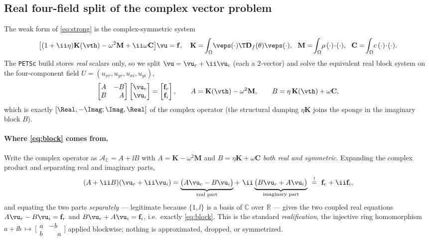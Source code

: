 \subsection{Real four-field split of the complex vector problem}
The weak form of \eqref{eq:strong} is the complex-symmetric system
\begin{equation}
  \bigl[(1+\ii\eta)\mathbf K(\vth)-\omega^2\mathbf M+\ii\omega\mathbf C\bigr]\vu
  =\mathbf f,\quad
  \mathbf K=\!\int_\Omega\!\veps(\cdot)\T\mathbf D_f(\theta)\veps(\cdot),\ \
  \mathbf M=\!\int_\Omega\!\rho\,(\cdot)\!\cdot\!(\cdot),\ \
  \mathbf C=\!\int_\Omega\!c\,(\cdot)\!\cdot\!(\cdot).
  \label{eq:complex}
\end{equation}
The \texttt{PETSc} build stores \emph{real} scalars only, so we split
$\vu=\vu_r+\ii\vu_i$ (each a 2-vector) and solve the equivalent real block system
on the four-component field $U=(u_{xr},u_{yr},u_{xi},u_{yi})$,
\begin{equation}
  \begin{bmatrix} A & -B\\ B & \phantom{-}A\end{bmatrix}
  \begin{bmatrix} \vu_r\\ \vu_i\end{bmatrix}
  =\begin{bmatrix} \mathbf f_r\\ \mathbf f_i\end{bmatrix},\qquad
  A=\mathbf K(\vth)-\omega^2\mathbf M,\qquad B=\eta\,\mathbf K(\vth)+\omega\mathbf C,
  \label{eq:block}
\end{equation}
which is exactly $[\Real,-\Imag;\Imag,\Real]$ of the complex operator (the
structural damping $\eta\mathbf K$ joins the sponge in the imaginary block $B$).

\paragraph{Where \eqref{eq:block} comes from.} Write the complex operator as
$\mathcal A_{\mathbb C}=A+\ii B$ with $A=\mathbf K-\omega^2\mathbf M$ and
$B=\eta\mathbf K+\omega\mathbf C$ \emph{both real and symmetric}. Expanding the
complex product and separating real and imaginary parts,
\begin{equation}
  (A+\ii B)(\vu_r+\ii\vu_i)
  =\underbrace{\bigl(A\vu_r-B\vu_i\bigr)}_{\text{real part}}
  +\ \ii\underbrace{\bigl(B\vu_r+A\vu_i\bigr)}_{\text{imaginary part}}
  \ \overset{!}{=}\ \mathbf f_r+\ii\mathbf f_i ,
\end{equation}
and equating the two parts \emph{separately} --- legitimate because
$\{1,\ii\}$ is a basis of $\mathbb C$ over $\mathbb R$ --- gives the two coupled
real equations $A\vu_r-B\vu_i=\mathbf f_r$ and $B\vu_r+A\vu_i=\mathbf f_i$, i.e.\
exactly \eqref{eq:block}. This is the standard \emph{realification}, the injective
ring homomorphism
$a+\ii b\ \mapsto\ \bigl[\begin{smallmatrix}a&-b\\ b&\phantom{-}a\end{smallmatrix}\bigr]$
applied blockwise; nothing is approximated, dropped, or symmetrized.

